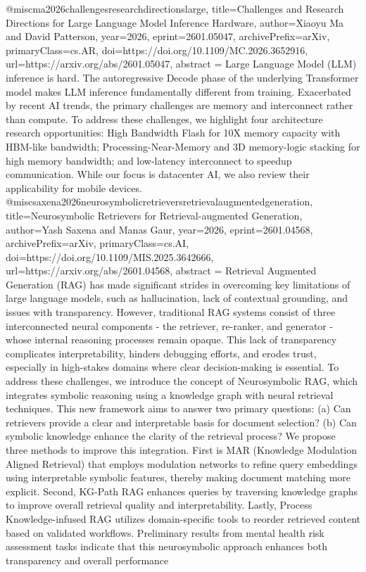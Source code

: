 {}@misc{ma2026challengesresearchdirectionslarge,
      title={Challenges and Research Directions for Large Language Model Inference Hardware}, 
      author={Xiaoyu Ma and David Patterson},
      year={2026},
      eprint={2601.05047},
      archivePrefix={arXiv},
      primaryClass={cs.AR},
      doi={https://doi.org/10.1109/MC.2026.3652916},
      url={https://arxiv.org/abs/2601.05047},
      abstract = {Large Language Model (LLM) inference is hard. The autoregressive Decode phase of the underlying Transformer model makes LLM inference fundamentally different from training. Exacerbated by recent AI trends, the primary challenges are memory and interconnect rather than compute. To address these challenges, we highlight four architecture research opportunities: High Bandwidth Flash for 10X memory capacity with HBM-like bandwidth; Processing-Near-Memory and 3D memory-logic stacking for high memory bandwidth; and low-latency interconnect to speedup communication. While our focus is datacenter AI, we also review their applicability for mobile devices.}
}@misc{saxena2026neurosymbolicretrieversretrievalaugmentedgeneration,
      title={Neurosymbolic Retrievers for Retrieval-augmented Generation}, 
      author={Yash Saxena and Manas Gaur},
      year={2026},
      eprint={2601.04568},
      archivePrefix={arXiv},
      primaryClass={cs.AI},
      doi={https://doi.org/10.1109/MIS.2025.3642666},
      url={https://arxiv.org/abs/2601.04568},
      abstract = {Retrieval Augmented Generation (RAG) has made significant strides in overcoming key limitations of large language models, such as hallucination, lack of contextual grounding, and issues with transparency. However, traditional RAG systems consist of three interconnected neural components - the retriever, re-ranker, and generator - whose internal reasoning processes remain opaque. This lack of transparency complicates interpretability, hinders debugging efforts, and erodes trust, especially in high-stakes domains where clear decision-making is essential. To address these challenges, we introduce the concept of Neurosymbolic RAG, which integrates symbolic reasoning using a knowledge graph with neural retrieval techniques. This new framework aims to answer two primary questions: (a) Can retrievers provide a clear and interpretable basis for document selection? (b) Can symbolic knowledge enhance the clarity of the retrieval process? We propose three methods to improve this integration. First is MAR (Knowledge Modulation Aligned Retrieval) that employs modulation networks to refine query embeddings using interpretable symbolic features, thereby making document matching more explicit. Second, KG-Path RAG enhances queries by traversing knowledge graphs to improve overall retrieval quality and interpretability. Lastly, Process Knowledge-infused RAG utilizes domain-specific tools to reorder retrieved content based on validated workflows. Preliminary results from mental health risk assessment tasks indicate that this neurosymbolic approach enhances both transparency and overall performance}
}
